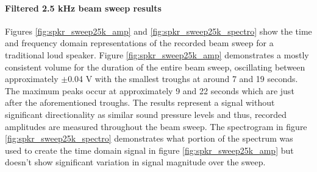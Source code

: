 \paragraph{Filtered 2.5 kHz beam sweep results}
Figures \ref{fig:spkr_sweep25k_amp} and \ref{fig:spkr_sweep25k_spectro} show the time and frequency domain representations of the recorded beam sweep for a traditional loud speaker. Figure \ref{fig:spkr_sweep25k_amp} demonstrates a mostly consistent volume for the duration of the entire beam sweep, oscillating between approximately $\pm$0.04 V with the smallest troughs at around 7 and 19 seconds. The maximum peaks occur at approximately 9 and 22 seconds which are just after the aforementioned troughs. The results represent a signal without significant directionality as similar sound pressure levels and thus, recorded amplitudes are measured throughout the beam sweep. The spectrogram in figure \ref{fig:spkr_sweep25k_spectro} demonstrates what portion of the spectrum was used to create the time domain signal in figure \ref{fig:spkr_sweep25k_amp} but doesn't show significant variation in signal magnitude over the sweep.
